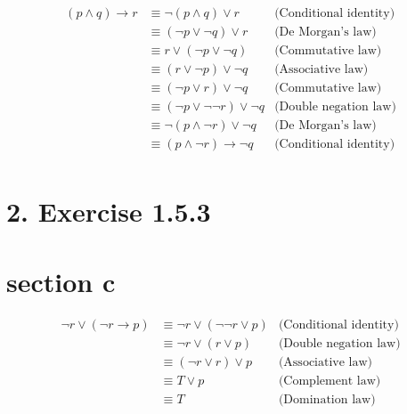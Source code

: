 \documentclass[10pt]{article}
\begin{document}
$$
\begin{aligned}
(p \wedge q) \rightarrow r & \equiv \neg(p \wedge q) \vee r & \text {(Conditional identity)}\\
& \equiv(\neg p \vee \neg q) \vee r                         & \text {(De Morgan's law)}\\
& \equiv r \vee(\neg p \vee \neg q)                         & \text {(Commutative law)}\\
& \equiv(r \vee \neg p) \vee \neg q                         & \text {(Associative law)}\\
& \equiv(\neg p \vee r) \vee \neg q                         & \text {(Commutative law)}\\
& \equiv(\neg p \vee \neg \neg r) \vee \neg q               & \text {(Double negation law)}\\
& \equiv \neg(p \wedge \neg r) \vee \neg q                  & \text {(De Morgan's law)}\\
& \equiv(p \wedge \neg r) \rightarrow \neg q                & \text {(Conditional identity)}\\
\end{aligned}
$$

\section*{2. Exercise 1.5.3}
\section*{section c}

$$
\begin{aligned}
\neg r \vee(\neg r \rightarrow p) & \equiv \neg r \vee(\neg \neg r \vee p) & \text {(Conditional identity)}\\
& \equiv \neg r \vee(r \vee p)                                             & \text {(Double negation law)}\\
& \equiv(\neg r \vee r) \vee p                                             & \text {(Associative law)}\\
& \equiv T \vee p                                                          & \text {(Complement law)}\\
& \equiv T                                                                   & \text {(Domination law)}\\
\end{aligned}
$$
\end{document}

